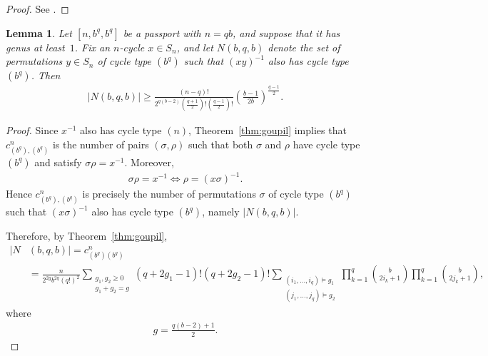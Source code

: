 \documentclass[12pt,reqno]{amsart}
\newcommand{\f}[2]{\frac{#1}{#2}}							%
\newcommand{\vt}[1]{\left\lvert #1 \right\rvert}					%
\theoremstyle{mythmstyle}
\newtheorem{lemma}{Lemma}[section]
\theoremstyle{mydefstyle}
\newcommand{\thmref}[1]{Theorem~\ref{#1}}
\numberwithin{equation}{section}
\begin{document}
\begin{proof}
See \cite[Theorem~3.3]{Ohnishi26}.
\end{proof}

\begin{lemma}
\label{lem:Nbqblower}
Let $[n,b^{q},b^{q}]$ be a passport with $n=qb$, and suppose that it has genus at least~$1$.
Fix an $n$-cycle $x \in S_n$, and let $N(b,q,b)$
denote the set of permutations $y \in S_n$ of cycle type $(b^{q})$ such that $(xy)^{-1}$ also has cycle type $(b^{q})$.
Then
\begin{align}
\vt{N(b, q, b)} \ge \f{(n-q)!}{2^{q(b-2)}\left(\f{q+1}{2}\right)!\left(\f{q-1}{2}\right)!}\left(\f{b-1}{2b}\right)^{\f{q-1}{2}}.
\end{align}
\end{lemma}

\begin{proof}
Since $x^{-1}$ also has cycle type $(n)$, \thmref{thm:goupil} implies that
$c_{(b^{q}),(b^{q})}^{n}$ is the number of pairs $(\sigma,\rho)$ such that
both $\sigma$ and $\rho$ have cycle type $(b^{q})$ and satisfy $\sigma\rho = x^{-1}$.
Moreover,
\begin{align}
\sigma\rho = x^{-1} \iff \rho = (x\sigma)^{-1}.
\end{align}
Hence $c_{(b^{q}),(b^{q})}^{n}$ is precisely the number of permutations
$\sigma$ of cycle type $(b^{q})$ such that $(x\sigma)^{-1}$ also has cycle type $(b^{q})$,
namely $\vt{N(b,q,b)}$.

Therefore, by \thmref{thm:goupil},
\begin{align}
\lvert N&(b, q, b) \rvert = c_{(b^{q})(b^{q})}^{n} \\
&= \f{n}{2^{2g}b^{2q}(q!)^{2}}\sum_{\substack{g_{1},g_{2}\ge 0\\ g_{1}+g_{2}=g}}(q+2g_{1}-1)! (q+2g_{2}-1)!
\sum_{\substack{(i_{1},\dotsc,i_{q})\vDash g_{1}\\(j_{1},\dotsc,j_{q})\vDash g_{2}}}
\prod_{k=1}^{q}\binom{b}{2i_{k}+1}\prod_{k=1}^{q}\binom{b}{2j_{k}+1},
\end{align}
where
\begin{align}
g = \f{q(b-2)+1}{2}.
\end{align}


\end{proof}
\end{document}
